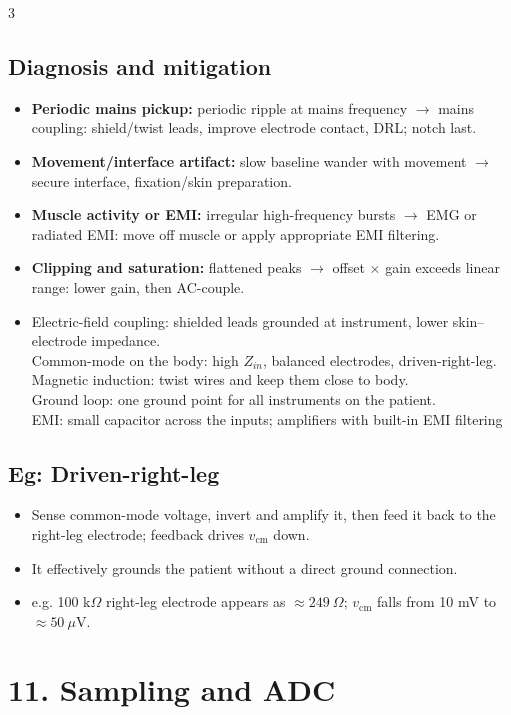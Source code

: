 \documentclass[10pt,a4paper]{ctexart}
\newcommand{\key}[1]{\textbf{#1}}
\begin{document}
\begin{multicols*}{3}
\subsection{Diagnosis and mitigation}
\begin{itemize}
  \item \key{Periodic mains pickup:} periodic ripple at mains frequency $\rightarrow$ mains coupling:
  shield/twist leads, improve electrode contact, DRL; notch last.
  \item \key{Movement/interface artifact:} slow baseline wander with movement $\rightarrow$ secure interface,
  fixation/skin preparation.
  \item \key{Muscle activity or EMI:} irregular high-frequency bursts $\rightarrow$ EMG or radiated EMI:
  move off muscle or apply appropriate EMI filtering.
  \item \key{Clipping and saturation:} flattened peaks $\rightarrow$ offset $\times$ gain exceeds linear range:
  lower gain, then AC-couple.
  \item Electric-field coupling: shielded leads grounded at instrument, lower skin–electrode impedance.\\
  Common-mode on the body: high $Z_{in}$, balanced electrodes, driven-right-leg.\\
  Magnetic induction: twist wires and keep them close to body.\\
  Ground loop: one ground point for all instruments on the patient.\\
  EMI: small capacitor across the inputs; amplifiers with built-in EMI filtering
\end{itemize}

\subsection{Eg: Driven-right-leg}
\begin{itemize}
  \item Sense common-mode voltage, invert and amplify it, then feed it back to
  the right-leg electrode; feedback drives $v_\mathrm{cm}$ down.
  \item It effectively grounds the patient without a direct ground connection.
  \item e.g. 100 k$\Omega$ right-leg electrode appears as $\approx249~\Omega$;
  $v_\mathrm{cm}$ falls from 10 mV to $\approx50~\mu$V.
\end{itemize}


\section{11. Sampling and ADC}

\end{multicols*}
\end{document}
